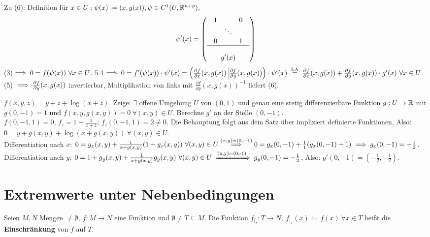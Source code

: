 \documentclass[a4paper,oneside,DIV15,BCOR12mm,chapterprefix=true,headings=onelinechapter]{scrbook}
\begin{document}
\begin{beweis}
Zu (6): Definition für $x\in U: \psi(x):=(x,g(x)), \psi\in C^1(U,\mathbb{R}^{n+p}),$
$$\psi'(x)=\left(\begin{array}{c}
\begin{array}{ccc}
1 & & 0 \\
& \ddots & \\
0 & & 1 \\
\end{array}\\
\hline \\
\displaystyle{g'(x)}
\end{array}\right)$$
(3)$\implies 0=f(\psi(x))\ \forall x\in U$. 5.4$\folgt 0=f'(\psi(x))\cdot\psi'(x)=\left(\frac{\partial f}{\partial x}(x, g(x))\ \vline \frac{\partial f}{\partial y}(x, g(x))\right)\cdot\psi'(x)\gleichnach{LA}\frac{\partial f}{\partial x}(x, g(x)) + \frac{\partial f}{\partial y}(x, g(x))\cdot g'(x)\ \forall x\in U$. (5) $\implies \frac{\partial f}{\partial y}(x, g(x))$ invertierbar, Multiplikation von links mit $\frac{\partial f}{\partial y}(x, g(x))^{-1}$ liefert (6).
\end{beweis}

\begin{beispiel}
$f(x,y,z)=y+z+\log(x+z)$. Zeige: $\exists$ offene Umgebung $U$ von $(0,1)$ und genau eine stetig differenzierbare Funktion $g:U\to\mathbb{R}$ mit $g(0,-1)=1$ und $f(x,y,g(x,y))=0\ \forall (x,y)\in U$. Berechne $g'$ an der Stelle $(0,-1)$.\\
$f(0,-1,1)=0$, $f_z=1+\frac{1}{x+z}$; $f_z(0,-1,1)=2\ne 0$. Die Behauptung folgt aus dem Satz über impliziert definierte Funktionen. Also: $0=y+g(x,y)+\log(x+g(x,y))\ \forall (x,y)\in U$.\\
Differentiation nach $x$: $0=g_x(x,y)+\frac{1}{x+g(x,y)}(1+g_x(x,y))\ \forall (x,y)\in U\overset{(x,y)=(0,-1)}{\folgt}0=g_x(0,-1)+\frac{1}{1}(g_x(0,-1)+1)\folgt g_x(0,-1)=-\frac{1}{2}$.\\
Differentiation nach $y$: $0=1+g_y(x,y)+\frac{1}{x+g(x,y)}g_y(x,y)\ \forall (x,y)\in U \folgtnach{(x,y)=(0,-1)}g_y(0,-1)=-\frac{1}{2}$. Also: $g'(0,-1)=(-\frac{1}{2},-\frac{1}{2})$.
\end{beispiel}

\chapter{Extremwerte unter Nebenbedingungen}

\begin{definition}
Seien $M,N$ Mengen $\ne \emptyset,\ f:M\to N$ eine Funktion und 
$\emptyset \ne T \subseteq M$. Die Funktion 
$f_{|_T}: T \to N,\ f_{|_T}(x) := f(x)\ \forall x \in T$ heißt die 
\textbf{Einschränkung} von $f$ auf $T$.
\end{definition}
\end{document}
